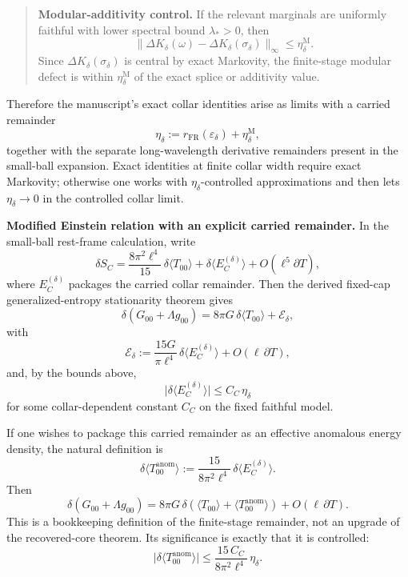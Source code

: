 \begin{quote}
\textbf{Modular-additivity control.} If the relevant marginals are uniformly faithful with lower spectral bound \(\lambda_\ast>0\), then
\[
\|\Delta K_\delta(\omega)-\Delta K_\delta(\sigma_\delta)\|_\infty
\le
\eta_\delta^{\mathrm M}.
\]
Since \(\Delta K_\delta(\sigma_\delta)\) is central by exact Markovity, the finite-stage modular defect is within \(\eta_\delta^{\mathrm M}\) of the exact splice or additivity value.
\end{quote}

Therefore the manuscript's exact collar identities arise as limits with a carried remainder
\[
\eta_\delta
:=
r_{\mathrm{FR}}(\varepsilon_\delta)
+
\eta_\delta^{\mathrm M},
\]
together with the separate long-wavelength derivative remainders present in the small-ball expansion. Exact identities at finite collar width require exact Markovity; otherwise one works with \(\eta_\delta\)-controlled approximations and then lets \(\eta_\delta\to0\) in the controlled collar limit.

\textbf{Modified Einstein relation with an explicit carried remainder.} In the small-ball rest-frame calculation, write
\[
\delta S_C
=
\frac{8\pi^2\ell^4}{15}\,\delta\langle T_{00}\rangle
+
\delta\langle E_C^{(\delta)}\rangle
+
O(\ell^5\partial T),
\]
where \(E_C^{(\delta)}\) packages the carried collar remainder. Then the derived fixed-cap generalized-entropy stationarity theorem gives
\[
\delta\!\left(G_{00}+\Lambda g_{00}\right)
=
8\pi G\,\delta\langle T_{00}\rangle
+
\mathcal E_\delta,
\]
with
\[
\mathcal E_\delta
:=
\frac{15G}{\pi\ell^4}\,
\delta\langle E_C^{(\delta)}\rangle
+
O(\ell\,\partial T),
\]
and, by the bounds above,
\[
\bigl|
\delta\langle E_C^{(\delta)}\rangle
\bigr|
\le
C_C\,\eta_\delta
\]
for some collar-dependent constant \(C_C\) on the fixed faithful model.

If one wishes to package this carried remainder as an effective anomalous energy density, the natural definition is
\[
\delta\langle T_{00}^{\mathrm{anom}}\rangle
:=
\frac{15}{8\pi^2\ell^4}\,
\delta\langle E_C^{(\delta)}\rangle.
\]
Then
\[
\delta\!\left(G_{00}+\Lambda g_{00}\right)
=
8\pi G\,
\delta\!\left(
\langle T_{00}\rangle
+
\langle T_{00}^{\mathrm{anom}}\rangle
\right)
+
O(\ell\,\partial T).
\]
This is a bookkeeping definition of the finite-stage remainder, not an upgrade of the recovered-core theorem. Its significance is exactly that it is controlled:
\[
\bigl|
\delta\langle T_{00}^{\mathrm{anom}}\rangle
\bigr|
\le
\frac{15\,C_C}{8\pi^2\ell^4}\,
\eta_\delta.
\]

